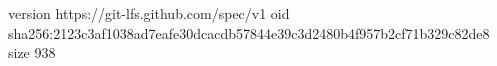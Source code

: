 version https://git-lfs.github.com/spec/v1
oid sha256:2123c3af1038ad7eafe30dcacdb57844e39c3d2480b4f957b2cf71b329c82de8
size 938
